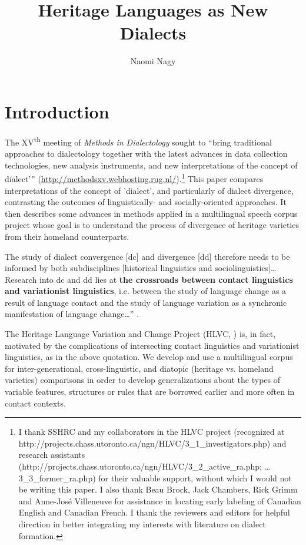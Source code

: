 \documentclass[output=paper]{LSP/langsci}
\author{Naomi Nagy\affiliation{University of Toronto, Department of Linguistics }}
\title{Heritage Languages as New Dialects}
\begin{document}
% 


\section{Introduction}
The XV\textsuperscript{th} meeting of \textit{Methods in Dialectology} sought to “bring traditional approaches to dialectology together with the latest advances in data collection technologies, new analysis instruments, and new interpretations of the concept of dialect'” (\url{http://methodsxv.webhosting.rug.nl/}).\footnote{ I thank SSHRC and my collaborators in the HLVC project (recognized at http://projects.chass.utoronto.ca/ngn/HLVC/3\_1\_investigators.php) and research assistants (http://projects.chass.utoronto.ca/ngn/HLVC/3\_2\_active\_ra.php; … 3\_3\_former\_ra.php) for their valuable support, without which I would not be writing this paper. I also thank Beau Brock, Jack Chambers, Rick Grimm and Anne-José Villeneuve for assistance in locating early labeling of Canadian English and Canadian French. I thank the reviewers and editors for helpful direction in better integrating my interests with literature on dialect formation.
} This paper compares interpretations of the concept of 'dialect', and particularly of dialect divergence, contrasting the outcomes of linguistically- and socially-oriented approaches. It then describes some advances in methods applied in a multilingual speech corpus project whose goal is to understand the process of divergence of heritage varieties from their homeland counterparts.

The study of dialect convergence [dc] and divergence [dd] therefore needs to be informed by both subdisciplines [historical linguistics and sociolinguistics]… Research into dc and dd lies at \textbf{the crossroads between contact linguistics and variationist linguistics}, i.e. between the study of language change as a result of language contact and the study of language variation as a synchronic manifestation of language change…” \citep[16]{auer_study_2004}.

The Heritage Language Variation and Change Project (HLVC, \citealt{nagy_multilingual_2011}) is, in fact, motivated by the complications of intersecting \textbf{c}ontact linguistics and variationist linguistics, as in the above quotation. We develop and use a multilingual corpus for inter-generational, cross-linguistic, and diatopic (heritage vs. homeland varieties) comparisons in order to develop generalizations about the types of variable features, structures or rules that are borrowed earlier and more often in contact contexts.  
\end{document}
